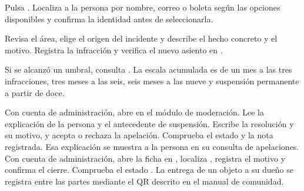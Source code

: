 \begin{pasos}
\item Pulsa . Localiza a la persona por nombre, correo o boleta según las opciones disponibles y confirma la identidad antes de seleccionarla.
\item Revisa el área, elige el origen del incidente y describe el hecho concreto y el motivo. Registra la infracción y verifica el nuevo asiento en .
\item Si se alcanzó un umbral, consulta . La escala acumulada es de un mes a las tres infracciones, tres meses a las seis, seis meses a las nueve y suspensión permanente a partir de doce.
\end{pasos}
Con cuenta de administración, abre  en el módulo de moderación. Lee la explicación de la persona y el antecedente de suspensión. Escribe la resolución y su motivo, y acepta o rechaza la apelación. Comprueba el estado y la nota registrada. Esa explicación se muestra a la persona en su consulta de apelaciones.
Con cuenta de administración, abre la ficha en , localiza , registra el motivo y confirma el cierre. Comprueba el estado . La entrega de un objeto a su dueño se registra entre las partes mediante el QR descrito en el manual de comunidad.

